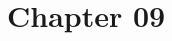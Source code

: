 \documentclass[../main]{subfiles}
\begin{document}
\setcounter{chapter}{8}

\chapter{Chapter 09}


















\end{document}
